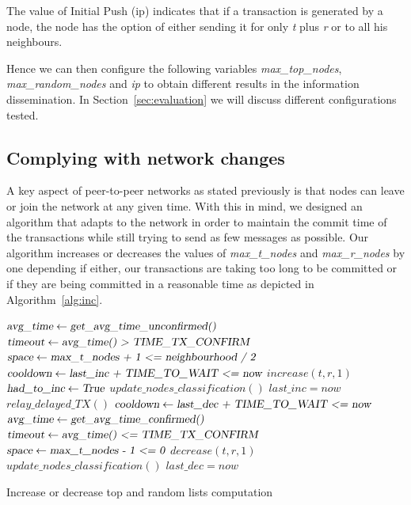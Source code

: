 \documentclass{dads}   %
\begin{document}
The value of Initial Push (ip) indicates that if a transaction is generated by a node, the node has the option of either sending it for only \textit{t} plus \textit{r} or to all his neighbours.

Hence we can then configure the following variables \textsl{max\_top\_nodes}, \textsl{max\_random\_nodes} and \textsl{ip} to obtain different results in the information dissemination. In Section~\ref{sec:evaluation} we will discuss different configurations tested.

\subsection{Complying with network changes}
\label{sec:nc}
A key aspect of peer-to-peer networks as stated previously is that nodes can leave or join the network at any given time. With this in mind, we designed an algorithm that adapts to the network in order to maintain the commit time of the transactions while still trying to send as few messages as possible. Our algorithm increases or decreases the values of \textsl{max\_t\_nodes} and \textsl{max\_r\_nodes} by one depending if either, our transactions are taking too long to be committed or if they are being committed in a reasonable time as depicted in Algorithm~\ref{alg:inc}.

\begin{algorithm}[t]
\begin{algorithmic}[1]
\State $\textsl{avg\_time} \gets \textsl{get\_avg\_time\_unconfirmed()}$
\State $\textsl{timeout} \gets \textsl{avg\_time() > TIME\_TX\_CONFIRM}$
\State $\textsl{space} \gets \textsl{max\_t\_nodes + 1 <= neighbourhood / 2}$
\State $\textsl{cooldown} \gets \textsl{last\_inc + TIME\_TO\_WAIT <= now}$
  \State $increase(t, r, 1)$
  \State $\textsl{had\_to\_inc} \gets \textsl{True}$
  \State $update\_nodes\_classification()$
  \State $last\_inc = now$
  \State $relay\_delayed\_TX()$
\EndIf
\State $\textsl{cooldown} \gets \textsl{last\_dec + TIME\_TO\_WAIT <= now}$
  \State $\textsl{avg\_time} \gets \textsl{get\_avg\_time\_confirmed()}$
  \State $\textsl{timeout} \gets \textsl{avg\_time() <= TIME\_TX\_CONFIRM}$
  \State $\textsl{space} \gets \textsl{max\_t\_nodes - 1 <= 0}$
    \State $decrease(t, r, 1)$
    \State $update\_nodes\_classification()$
    \State $last\_dec = now$
  \EndIf
\EndIf
\EndFunction
\end{algorithmic}
\caption{Increase or decrease top and random lists computation}
\label{alg:inc}
\end{algorithm}
\end{document}
